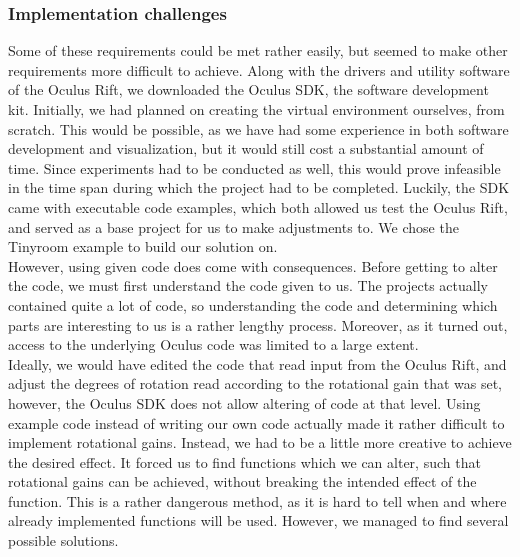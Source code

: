 \subsubsection{Implementation challenges}
Some of these requirements could be met rather easily, but seemed to make other requirements more difficult to achieve.
Along with the drivers and utility software of the Oculus Rift, we downloaded the Oculus SDK, the software development kit.
Initially, we had planned on creating the virtual environment ourselves, from scratch.
This would be possible, as we have had some experience in both software development and visualization, but it would still cost a substantial amount of time.
Since experiments had to be conducted as well, this would prove infeasible in the time span during which the project had to be completed.
Luckily, the SDK came with executable code examples, which both allowed us test the Oculus Rift, and served as a base project for us to make adjustments to. 
We chose the Tinyroom example to build our solution on.\\
However, using given code does come with consequences.
Before getting to alter the code, we must first understand the code given to us.
The projects actually contained quite a lot of code, so understanding the code and determining which parts are interesting to us is a rather lengthy process.
Moreover, as it turned out, access to the underlying Oculus code was limited to a large extent. \\

Ideally, we would have edited the code that read input from the Oculus Rift, and adjust the degrees of rotation read according to the rotational gain that was set, however, the Oculus SDK does not allow altering of code at that level.
Using example code instead of writing our own code actually made it rather difficult to implement rotational gains.
Instead, we had to be a little more creative to achieve the desired effect.
It forced us to find functions which we can alter, such that rotational gains can be achieved, without breaking the intended effect of the function.
This is a rather dangerous method, as it is hard to tell when and where already implemented functions will be used.
However, we managed to find several possible solutions. \\

